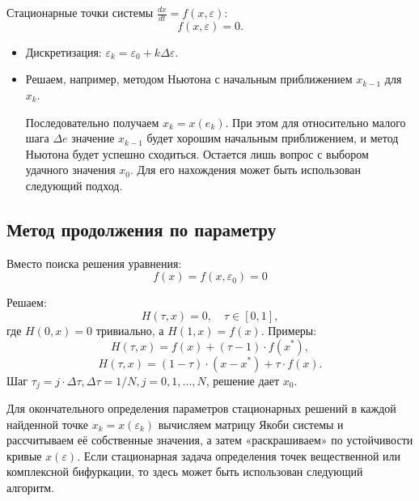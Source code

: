 	Стационарные точки системы \(\frac{d x}{d t} = f(x, \varepsilon)\):
	\begin{equation}
		f(x, \varepsilon) = 0.
	\end{equation}
	\begin{itemize}
		\item Дискретизация: \(\varepsilon_k = \varepsilon_0 + k \Delta \varepsilon\).
		\item Решаем, например, методом Ньютона с начальным приближением \(x_{k-1}\) для \(x_k\). 
		\par
		\vspace{0.5em}
		Последовательно получаем \(x_k = x(e_k)\). При этом для относительно малого шага \(\Delta e\) значение \(x_{k-1}\) будет хорошим начальным приближением, и метод Ньютона будет успешно сходиться.
		\newline
		Остается лишь вопрос с выбором удачного значения \(x_0\). Для его нахождения может быть использован следующий подход.
	\end{itemize}
	
	\subsection{Метод продолжения по параметру}
	Вместо поиска решения уравнения:
	\begin{equation}
		f(x) = f(x, \varepsilon_0) = 0
	\end{equation}
	\par
	\vspace{-0.5em}
	Решаем:
	\begin{equation}
		H(\tau, x) = 0, \quad \tau \in [0, 1],
	\end{equation}
	где \(H(0, x) = 0\) тривиально, а \(H(1, x) = f(x)\).
	\newline
	Примеры:
	\begin{equation}
		H(\tau, x) = f(x) + (\tau - 1) \cdot f(x^*),
	\end{equation}
	\begin{equation}
		H(\tau, x) = (1 - \tau) \cdot (x - x^*) + \tau \cdot f(x).
	\end{equation}
	Шаг \(\tau_j = j \cdot \Delta \tau, \Delta \tau = 1/ N, j = 0, 1, ..., N\), решение дает \(x_0\).
	\par
	\vspace{0.5em}
	Для окончательного определения параметров стационарных решений в каждой найденной точке \( x_k = x(\varepsilon_k) \) вычисляем матрицу Якоби системы и рассчитываем её собственные значения, а затем «раскрашиваем» по устойчивости кривые \( x(\varepsilon) \). Если стационарная задача определения точек вещественной или комплексной бифуркации, то здесь может быть использован следующий алгоритм.
	
